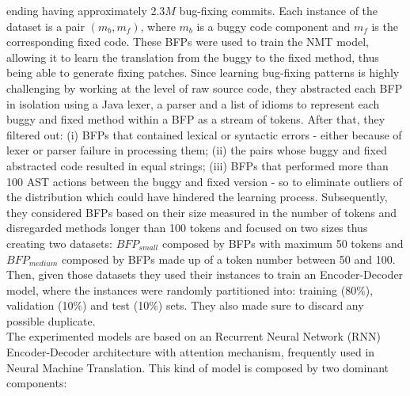 ending having approximately 2.3\(M\) bug-fixing commits.
Each instance of the dataset is a pair $(m_b, m_f)$, where $m_b$ is a buggy code component and $m_f$ is the
corresponding fixed code. These BFPs were used to train the NMT model, allowing it to learn the translation
from the buggy to the fixed method, thus being able to generate fixing patches. Since learning bug-fixing
patterns is highly challenging by working at the level of raw source code, they abstracted 
each BFP in isolation using a Java lexer, a parser and a list of idioms to represent each buggy and fixed method 
within a BFP as a stream of tokens. After that, they filtered out: (i) BFPs that contained lexical or syntactic 
errors - either because of lexer or parser failure in processing them; (ii) the pairs whose buggy 
and fixed abstracted code resulted in equal strings; (iii) BFPs that performed more than 100 AST actions between the buggy 
and fixed version - so to eliminate outliers of the distribution which could have hindered
the learning process. Subsequently, they considered BFPs based on their size measured
in the number of tokens and disregarded methods longer than 100 tokens and focused on two sizes thus creating 
two datasets: \(BFP_{small}\) composed by BFPs with maximum 50 tokens and \(BFP_{medium}\)
composed by BFPs made up of a token number between 50 and 100.
Then, given those datasets they used their instances to train an Encoder-Decoder
model, where the instances were randomly partitioned into: training (80\%), validation (10\%) and 
test (10\%) sets. They also made sure to discard any possible duplicate.\\
\newline
The experimented models are based on an Recurrent Neural Network (RNN) Encoder-Decoder
architecture with attention mechanism, frequently used in Neural Machine Translation. 
This kind of model is composed by two
dominant components:

